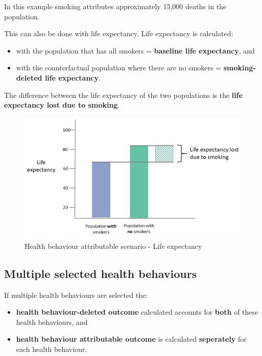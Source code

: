 \documentclass[]{book}
\providecommand{\tightlist}{%
  \setlength{\itemsep}{0pt}\setlength{\parskip}{0pt}}
\begin{document}
In this example smoking attributes approximately 15,000 deaths in the
population.

This can also be done with life expectancy. Life expectancy is
calculated:

\begin{itemize}
\tightlist
\item
  with the population that has all smokers = \textbf{baseline life
  expectancy}, and
\item
  with the counterfactual population where there are no smokers =
  \textbf{smoking-deleted life expectancy}.
\end{itemize}

The difference between the life expectancy of the two populations is the
\textbf{life expectancy lost due to smoking}.

\begin{figure}

{\centering \includegraphics{Images/HB attributable LE} 

}

\caption{Health behaviour attributable scenario - Life expectancy}\label{fig:unnamed-chunk-14}
\end{figure}

\subsection{Multiple selected health
behaviours}\label{multiple-selected-health-behaviours}

If multiple health behaviours are selected the:

\begin{itemize}
\tightlist
\item
  \textbf{health behaviour-deleted outcome} calculated accounts for
  \textbf{both} of these health behaviours, and
\item
  \textbf{health behaviour attributable outcome} is calculated
  \textbf{seperately} for each health behaviour.
\end{itemize}
\end{document}
